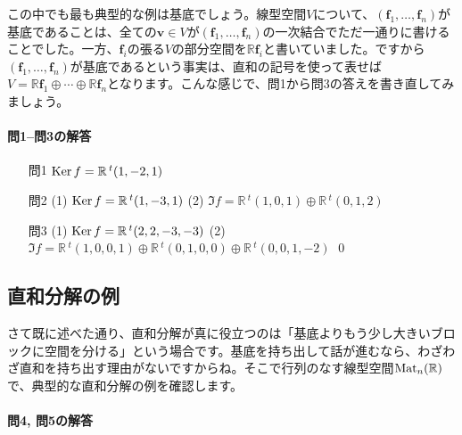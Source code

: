 この中でも最も典型的な例は基底でしょう。線型空間$V$について、$(\bm{f}_1, \ldots, \bm{f}_n)$が基底であることは、全ての$\bm{v} \in V$が$(\bm{f}_1, \ldots, \bm{f}_n)$の一次結合でただ一通りに書けることでした。一方、$\bm{f}_i$の張る$V$の部分空間を$\mathbb{R}\bm{f}_i$と書いていました。ですから$(\bm{f}_1, \ldots, \bm{f}_n)$が基底であるという事実は、直和の記号を使って表せば$V = \mathbb{R}\bm{f}_1 \oplus \cdots \oplus \mathbb{R}\bm{f}_n$となります。こんな感じで、問1から問3の答えを書き直してみましょう。

\paragraph{問1--問3の解答}
\begin{itemize}
\item[問1] $\operatorname{Ker} f = \mathbb{R}\,{}^t(1, -2, 1)$
\item[問2] (1) $\operatorname{Ker} f = \mathbb{R}\,{}^t(1, -3, 1)$ (2) $\Im f = \mathbb{R}\,{}^t(1, 0, 1) \oplus \mathbb{R}\,{}^t(0, 1, 2)$
\item[問3] (1) $\operatorname{Ker} f = \mathbb{R}\,{}^t(2, 2, -3, -3)$ (2) $\Im f = \mathbb{R}\,{}^t(1, 0, 0 ,1) \oplus \mathbb{R}\,{}^t(0, 1, 0 ,0) \oplus \mathbb{R}\,{}^t(0, 0, 1 ,-2)$ \qed
\end{itemize}

\subsection{直和分解の例}

さて既に述べた通り、直和分解が真に役立つのは「基底よりもう少し大きいブロックに空間を分ける」という場合です。基底を持ち出して話が進むなら、わざわざ直和を持ち出す理由がないですからね。そこで行列のなす線型空間$\operatorname{Mat}_n(\mathbb{R})$で、典型的な直和分解の例を確認します。

\paragraph{問4, 問5の解答}


